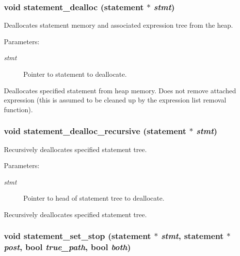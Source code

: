 \subsubsection{\setlength{\rightskip}{0pt plus 5cm}void statement\_\-dealloc ({\bf statement} $\ast$ {\em stmt})}\label{statement_8h_a6}


Deallocates statement memory and associated expression tree from the heap. 

\begin{Desc}
\item[Parameters:]
\begin{description}
\item[{\em stmt}]Pointer to statement to deallocate.\end{description}
\end{Desc}
Deallocates specified statement from heap memory. Does not remove attached expression (this is assumed to be cleaned up by the expression list removal function). 
\subsubsection{\setlength{\rightskip}{0pt plus 5cm}void statement\_\-dealloc\_\-recursive ({\bf statement} $\ast$ {\em stmt})}\label{statement_8h_a5}


Recursively deallocates specified statement tree. 

\begin{Desc}
\item[Parameters:]
\begin{description}
\item[{\em stmt}]Pointer to head of statement tree to deallocate.\end{description}
\end{Desc}
Recursively deallocates specified statement tree. 
\subsubsection{\setlength{\rightskip}{0pt plus 5cm}void statement\_\-set\_\-stop ({\bf statement} $\ast$ {\em stmt}, {\bf statement} $\ast$ {\em post}, {\bf bool} {\em true\_\-path}, {\bf bool} {\em both})}\label{statement_8h_a4}


